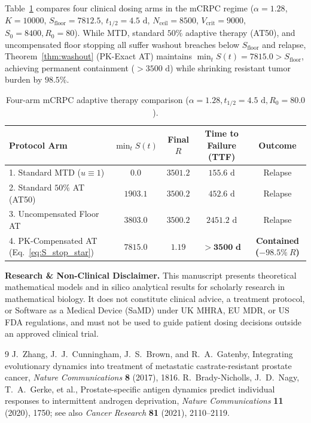 \documentclass[11pt,reqno]{article}
\begin{document}
Table~\ref{tab:trial} compares four clinical dosing arms in the mCRPC regime ($\alpha=1.28$, $K=10000$, $S_{\mathrm{floor}}=7812.5$, $t_{1/2}=4.5\text{ d}$, $N_{\mathrm{ceil}}=8500$, $V_{\mathrm{crit}}=9000$, $S_0=8400, R_0=80$). While MTD, standard $50\%$ adaptive therapy (AT50), and uncompensated floor stopping all suffer washout breaches below $S_{\mathrm{floor}}$ and relapse, Theorem~\ref{thm:washout} (PK-Exact AT) maintains $\min_t S(t) = 7815.0 > S_{\mathrm{floor}}$, achieving permanent containment ($>3500\text{ d}$) while shrinking resistant tumor burden by $98.5\%$.

\begin{table}[ht]
\centering
\caption{Four-arm mCRPC adaptive therapy comparison ($\alpha=1.28, t_{1/2}=4.5\text{ d}, R_0=80.0$).}\label{tab:trial}
\smallskip
\begin{tabular}{@{}lcccc@{}}
\toprule
Protocol Arm & $\min_t S(t)$ & Final $R$ & Time to Failure (TTF) & Outcome \\
\midrule
1. Standard MTD ($u\equiv 1$) & $0.0$ & $3501.2$ & $155.6\text{ d}$ & Relapse \\
2. Standard $50\%$ AT (AT50) & $1903.1$ & $3500.2$ & $452.6\text{ d}$ & Relapse \\
3. Uncompensated Floor AT & $3803.0$ & $3500.2$ & $2451.2\text{ d}$ & Relapse \\
4. PK-Compensated AT (Eq.~\ref{eq:S_stop_star}) & $\mathbf{7815.0}$ & $\mathbf{1.19}$ & $\mathbf{>3500\text{ d}}$ & \textbf{Contained ($-98.5\%\ R$)} \\
\bottomrule
\end{tabular}
\end{table}

\medskip\noindent\textbf{Research \& Non-Clinical Disclaimer.} This manuscript presents theoretical mathematical models and in silico analytical results for scholarly research in mathematical biology. It does not constitute clinical advice, a treatment protocol, or Software as a Medical Device (SaMD) under UK MHRA, EU MDR, or US FDA regulations, and must not be used to guide patient dosing decisions outside an approved clinical trial.

\begin{thebibliography}{9}
 J.~Zhang, J.~J.~Cunningham, J.~S.~Brown, and R.~A.~Gatenby, Integrating evolutionary dynamics into treatment of metastatic castrate-resistant prostate cancer, \emph{Nature Communications} \textbf{8} (2017), 1816.
 R.~Brady-Nicholls, J.~D.~Nagy, T.~A.~Gerke, et al., Prostate-specific antigen dynamics predict individual responses to intermittent androgen deprivation, \emph{Nature Communications} \textbf{11} (2020), 1750; see also \emph{Cancer Research} \textbf{81} (2021), 2110--2119.
\end{thebibliography}
\end{document}
